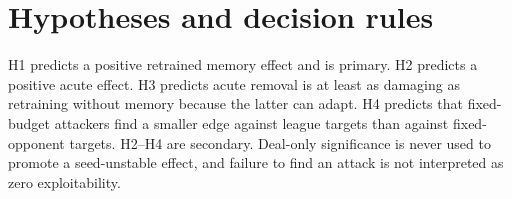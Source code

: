 \documentclass[10pt]{article}
\begin{document}
\section{Hypotheses and decision rules}

H1 predicts a positive retrained memory effect and is primary. H2 predicts a positive acute effect. H3 predicts acute removal is at least as damaging as retraining without memory because the latter can adapt. H4 predicts that fixed-budget attackers find a smaller edge against league targets than against fixed-opponent targets. H2--H4 are secondary. Deal-only significance is never used to promote a seed-unstable effect, and failure to find an attack is not interpreted as zero exploitability.
\end{document}
